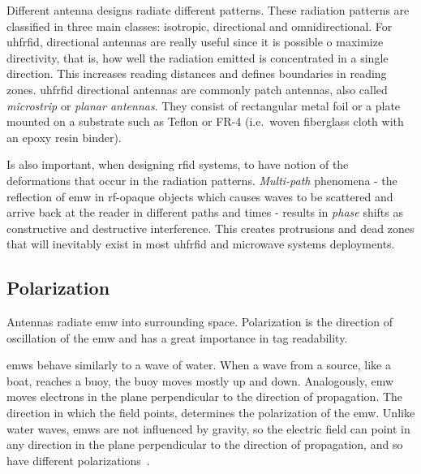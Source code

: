 Different antenna designs radiate different patterns. These radiation patterns are classified in three main classes: isotropic, directional and omnidirectional.
For \ac{uhfrfid}, directional antennas are really useful since it is possible o maximize directivity, that is, how well the radiation emitted is concentrated in a single direction. This increases reading distances and defines boundaries in reading zones. \ac{uhfrfid} directional antennas are commonly patch antennas, also called \emph{microstrip} or \emph{planar antennas}. They consist of rectangular metal foil or a plate mounted on a substrate such as Teflon or FR-4 (i.e.\ woven fiberglass cloth with an epoxy resin binder).

Is also important, when designing \ac{rfid} systems, to have notion of the deformations that occur in the radiation patterns.
\emph{Multi-path} phenomena - the reflection of \ac{emw} in \ac{rf}-opaque objects which causes waves to be scattered and arrive back at the reader in different paths and times - results in \emph{phase} shifts as constructive and destructive interference.
This creates protrusions and dead zones that will inevitably exist in most \ac{uhfrfid} and microwave systems deployments. 



\subsection{Polarization}

Antennas radiate \ac{emw} into surrounding space.
Polarization is the direction of oscillation of the \ac{emw} and has a great importance in tag readability.

\acp{emw} behave similarly to a wave of water. When a wave from a source, like a boat, reaches a buoy, the buoy moves mostly up and down.
Analogously, \ac{emw} moves electrons in the plane perpendicular to the direction of propagation. The direction in which the field points, determines the polarization of the \ac{emw}.
Unlike water waves, \acp{emw} are not influenced by gravity, so the electric field can point in any direction in the plane perpendicular to the direction of propagation, and so have different polarizations~\cite{dobkinRFRFIDSecond2012}.

